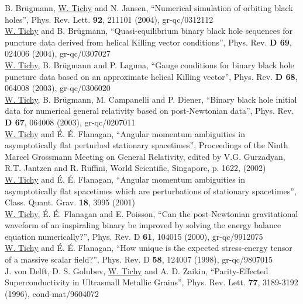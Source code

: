 B. Br\"ugmann, \underline{W. Tichy} and N. Jansen,
``Numerical simulation of orbiting black holes'',
Phys. Rev. Lett. {\bf 92}, 211101 (2004), gr-qc/0312112
\\

\underline{W. Tichy} and B. Br\"ugmann,
``Quasi-equilibrium binary black hole sequences for 
puncture data derived from helical Killing vector conditions'', 
Phys. Rev. {\bf D 69}, 024006 (2004), gr-qc/0307027
\\

\underline{W. Tichy}, B. Br\"ugmann and P. Laguna, 
``Gauge conditions for binary black hole puncture data 
based on an approximate helical Killing vector'', 
Phys. Rev. {\bf D 68}, 064008 (2003), gr-qc/0306020
\\

\underline{W. Tichy}, B. Br\"ugmann, M. Campanelli and P. Diener, 
``Binary black hole initial data for numerical general
relativity based on post-Newtonian data'', 
Phys. Rev. {\bf D 67}, 064008 (2003), gr-qc/0207011
\\

\underline{W. Tichy} and \'E. \'E. Flanagan,
``Angular momentum ambiguities in asymptotically flat perturbed
stationary spacetimes'',
Proceedings of the Ninth Marcel Grossmann Meeting on
General Relativity, edited by V.G. Gurzadyan, R.T. Jantzen and R. Ruffini,
World Scientific, Singapore, p. 1622, (2002)
\\

\underline{W. Tichy} and \'E. \'E. Flanagan,
``Angular momentum ambiguities in asymptotically flat spacetimes which 
are perturbations of stationary spacetimes'', 
Class. Quant. Grav. {\bf 18}, 3995 (2001)
\\

\underline{W. Tichy}, \'E. \'E. Flanagan and E. Poisson,
``Can the post-Newtonian gravitational waveform of an inspiraling binary
be improved by solving the energy balance equation numerically?'',
Phys. Rev. D {\bf 61}, 104015 (2000), gr-qc/9912075 
\\

\underline{W. Tichy} and \'E. \'E. Flanagan, 
``How unique is the expected stress-energy tensor of a massive scalar
field?'',
Phys. Rev. D {\bf 58}, 124007 (1998), gr-qc/9807015 
\\

J. von Delft, D. S. Golubev, \underline{W. Tichy} and A. D. Zaikin,
``Parity-Effected Superconductivity in Ultrasmall Metallic Grains'',
Phys. Rev. Lett. {\bf 77}, 3189-3192 (1996), cond-mat/9604072 
\\
